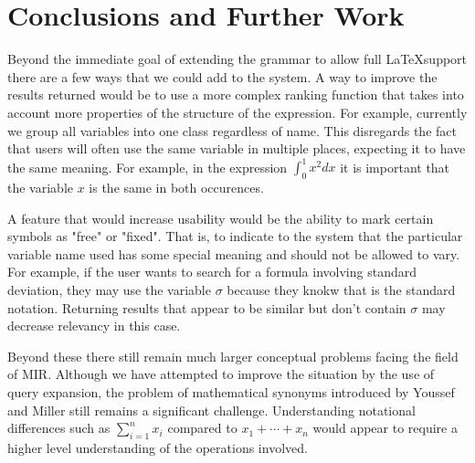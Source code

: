 \documentclass{sig-alternate}
\begin{document}
\section{Conclusions and Further Work}
Beyond the immediate goal of extending the grammar to allow full \LaTeX support there are a few ways that we could 
add to the system. A way to improve the results returned would be to use a more complex ranking function that takes into
account more properties of the structure of the expression. For example, currently we group all variables into one
class regardless of name. This disregards the fact that users will often use the same variable in multiple places, 
expecting it to have the same meaning. For example, in the expression $\int_{0}^{1}x^{2} dx$ it is important that
the variable $x$ is the same in both occurences. 

A feature that would increase usability would be the ability to mark certain symbols as "free" or "fixed". That is, to
indicate to the system that the particular variable name used has some special meaning and should not be allowed
to vary. For example, if the user wants to search for a formula involving standard deviation, they may use the
variable $\sigma$ because they knokw that is the standard notation. Returning results that appear to be similar but don't
contain $\sigma$ may decrease relevancy in this case.

Beyond these there still remain much larger conceptual problems facing the field of MIR. Although we have attempted to
improve the situation by the use of query expansion, the problem of mathematical synonyms introduced by Youssef and Miller still remains a significant challenge. Understanding notational differences such as $\sum_{i=1}^{n}x_i$ compared to
$x_1 + \cdots + x_n$ would appear to require a higher level understanding of the operations involved. 

%


\pagebreak
\appendix
\end{document}
